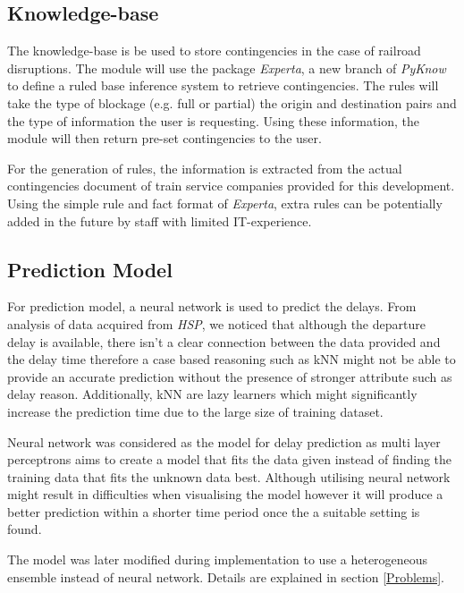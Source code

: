 \documentclass[11pt]{article}
\begin{document}
\subsection{Knowledge-base}
The knowledge-base is be used to store contingencies in the case of railroad disruptions. The module will use the package \textit{Experta}, a new branch of \textit{PyKnow} to define a ruled base inference system to retrieve contingencies. The rules will take the type of blockage (e.g. full or partial) the origin and destination pairs and the type of information the user is requesting. Using these information, the module will then return pre-set contingencies to the user.

For the generation of rules, the information is extracted from the actual contingencies document of train service companies provided for this development. Using the simple rule and fact format of \textit{Experta}, extra rules can be potentially added in the future by staff with limited IT-experience.

\subsection{Prediction Model}
For prediction model, a neural network is used to predict the delays. From analysis of data acquired from \textit{HSP}, we noticed that although the departure delay is available, there isn't a clear connection between the data provided and the delay time therefore a case based reasoning such as kNN might not be able to provide an accurate prediction without the presence of stronger attribute such as delay reason. Additionally, kNN are lazy learners which might significantly increase the prediction time due to the large size of training dataset.

Neural network was considered as the model for delay prediction as multi layer perceptrons aims to create a model that fits the data given instead of finding the training data that fits the unknown data best. Although utilising neural network might result in difficulties when visualising the model however it will produce a better prediction within a shorter time period once the a suitable setting is found.

The model was later modified during implementation to use a heterogeneous ensemble instead of neural network. Details are explained in section \ref{Problems}.
\end{document}
